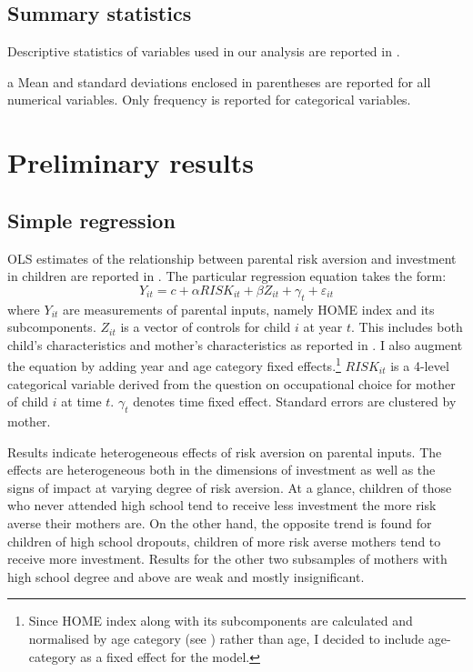 \documentclass[]{article}
\begin{document}
\subsection{Summary statistics}
Descriptive statistics of variables used in our analysis are reported in . 

\begin{ThreePartTable}
	\centering
	\setlength{\extrarowheight}{0.2em}
	\begin{TableNotes}\footnotesize
		\item[a] Mean and standard deviations enclosed in parentheses are reported for all numerical variables. Only frequency is reported for categorical variables.
	\end{TableNotes}
	
\end{ThreePartTable}

\section{Preliminary results}
\subsection{Simple regression}
OLS estimates of the relationship between parental risk aversion and investment in children are reported in . The particular regression equation takes the form:
\begin{equation}
	Y_{it} = c + \alpha RISK_{it} + \beta Z_{it} + \gamma_t +  \varepsilon_{it}
\end{equation}
where $Y_{it}$ are measurements of parental inputs, namely HOME index and its subcomponents. $Z_{it}$ is a vector of controls for child $i$ at year $t$. This includes both child's characteristics and mother's characteristics as reported in . I also augment the equation by adding year and age category fixed effects.\footnote{Since HOME index along with its subcomponents are calculated and normalised by age category (see ) rather than age, I decided to include age-category as a fixed effect for the model.} $RISK_{it}$ is a 4-level categorical variable derived from the question on occupational choice for mother of child $i$ at time $t$. $\gamma_t$ denotes time fixed effect. Standard errors are clustered by mother. 

Results indicate heterogeneous effects of risk aversion on parental inputs. The effects are heterogeneous both in the dimensions of investment as well as the signs of impact at varying degree of risk aversion. At a glance, children of those who never attended high school tend to receive less investment the more risk averse their mothers are. On the other hand, the opposite trend is found for children of high school dropouts, children of more risk averse mothers tend to receive more investment. Results for the other two subsamples of mothers with high school degree and above are weak and mostly insignificant. 
\end{document}

